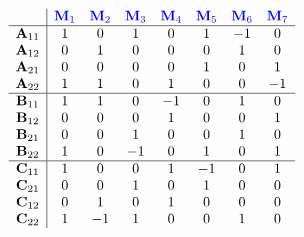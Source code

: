     \pagebreak
    \vspace{-50pt}
    \begin{multicols}{2}
        \setlength{\arraycolsep}{3pt}
        \[\begin{array}{c|ccccccc}
                & \color{blue} \mathbf{M}_1 & \color{blue} \mathbf{M}_2 & \color{blue} \mathbf{M}_3 & \color{blue} \mathbf{M}_4 & \color{blue} \mathbf{M}_5 & \color{blue} \mathbf{M}_6 & \color{blue} \mathbf{M}_7 \\
                \hline
                \mathbf{A}_{11} & 1 & 0 & 1 & 0 & 1 & -1 & 0 \\
                \mathbf{A}_{12} & 0 & 1 & 0 & 0 & 0 & 1 & 0 \\
                \mathbf{A}_{21} & 0 & 0 & 0 & 0 & 1 & 0 & 1 \\
                \mathbf{A}_{22} & 1 & 1 & 0 & 1 & 0 & 0 & -1 \\
                \hline
                \mathbf{B}_{11} & 1 & 1 & 0 & -1 & 0 & 1 & 0 \\
                \mathbf{B}_{12} & 0 & 0 & 0 & 1 & 0 & 0 & 1 \\
                \mathbf{B}_{21} & 0 & 0 & 1 & 0 & 0 & 1 & 0 \\
                \mathbf{B}_{22} & 1 & 0 & -1 & 0 & 1 & 0 & 1 \\
                \hline
                \mathbf{C}_{11} & 1 & 0 & 0 & 1 & -1 & 0 & 1 \\
                \mathbf{C}_{21} & 0 & 0 & 1 & 0 & 1 & 0 & 0 \\
                \mathbf{C}_{12} & 0 & 1 & 0 & 1 & 0 & 0 & 0 \\
                \mathbf{C}_{22} & 1 & -1 & 1 & 0 & 0 & 1 & 0 \\
        \end{array}\]

        \columnbreak


\end{multicols}
